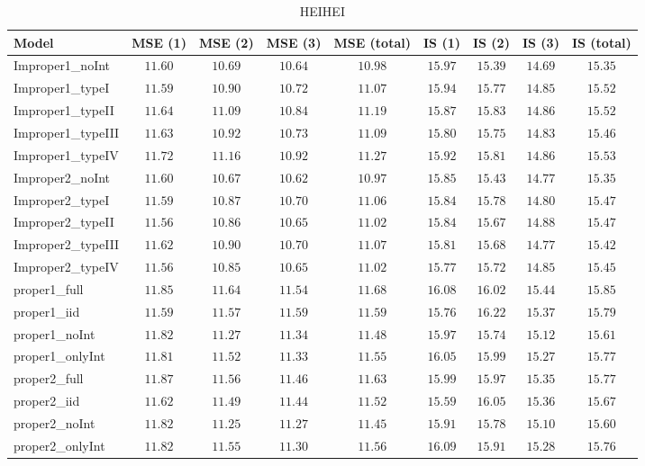 \begin{table}

\caption{\label{tab:model-choice-sc1}HEIHEI}
\centering
\begin{tabular}{lcccccccc}
\hline
Model  & MSE (1) & MSE (2) & MSE (3) & MSE (total) & IS (1) & IS (2) & IS (3) & \multicolumn{1}{c}{IS (total)} \\ 
\hline
Improper1_noInt  & $11.60$ & $10.69$ & $10.64$ & $10.98$ & $15.97$ & $15.39$ & $14.69$ & $15.35$ \\
Improper1_typeI  & $11.59$ & $10.90$ & $10.72$ & $11.07$ & $15.94$ & $15.77$ & $14.85$ & $15.52$ \\
Improper1_typeII  & $11.64$ & $11.09$ & $10.84$ & $11.19$ & $15.87$ & $15.83$ & $14.86$ & $15.52$ \\
Improper1_typeIII  & $11.63$ & $10.92$ & $10.73$ & $11.09$ & $15.80$ & $15.75$ & $14.83$ & $15.46$ \\
Improper1_typeIV  & $11.72$ & $11.16$ & $10.92$ & $11.27$ & $15.92$ & $15.81$ & $14.86$ & $15.53$ \\
Improper2_noInt  & $11.60$ & $10.67$ & $10.62$ & $10.97$ & $15.85$ & $15.43$ & $14.77$ & $15.35$ \\
Improper2_typeI  & $11.59$ & $10.87$ & $10.70$ & $11.06$ & $15.84$ & $15.78$ & $14.80$ & $15.47$ \\
Improper2_typeII  & $11.56$ & $10.86$ & $10.65$ & $11.02$ & $15.84$ & $15.67$ & $14.88$ & $15.47$ \\
Improper2_typeIII  & $11.62$ & $10.90$ & $10.70$ & $11.07$ & $15.81$ & $15.68$ & $14.77$ & $15.42$ \\
Improper2_typeIV  & $11.56$ & $10.85$ & $10.65$ & $11.02$ & $15.77$ & $15.72$ & $14.85$ & $15.45$ \\
proper1_full  & $11.85$ & $11.64$ & $11.54$ & $11.68$ & $16.08$ & $16.02$ & $15.44$ & $15.85$ \\
proper1_iid  & $11.59$ & $11.57$ & $11.59$ & $11.59$ & $15.76$ & $16.22$ & $15.37$ & $15.79$ \\
proper1_noInt  & $11.82$ & $11.27$ & $11.34$ & $11.48$ & $15.97$ & $15.74$ & $15.12$ & $15.61$ \\
proper1_onlyInt  & $11.81$ & $11.52$ & $11.33$ & $11.55$ & $16.05$ & $15.99$ & $15.27$ & $15.77$ \\
proper2_full  & $11.87$ & $11.56$ & $11.46$ & $11.63$ & $15.99$ & $15.97$ & $15.35$ & $15.77$ \\
proper2_iid  & $11.62$ & $11.49$ & $11.44$ & $11.52$ & $15.59$ & $16.05$ & $15.36$ & $15.67$ \\
proper2_noInt  & $11.82$ & $11.25$ & $11.27$ & $11.45$ & $15.91$ & $15.78$ & $15.10$ & $15.60$ \\
proper2_onlyInt  & $11.82$ & $11.55$ & $11.30$ & $11.56$ & $16.09$ & $15.91$ & $15.28$ & $15.76$ \\
\hline 
\end{tabular}


\end{table}